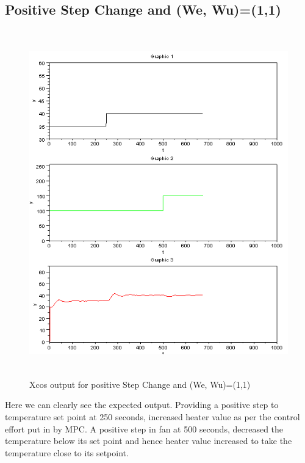 \subsection{Positive Step Change and (We, Wu)=(1,1)}
\begin{figure}[H]
  \includegraphics[width=12cm, height=15cm]{mpc/1_1.png}
  \caption{Xcos output for positive Step Change and (We, Wu)=(1,1)}
\end{figure}
Here we can clearly see the expected output. Providing a positive step to temperature set point at 250 seconds, increased heater value as per the control effort put in by MPC. A positive step in fan at 500 seconds, decreased the temperature below its set point and hence heater value increased to take the temperature close to its setpoint.
